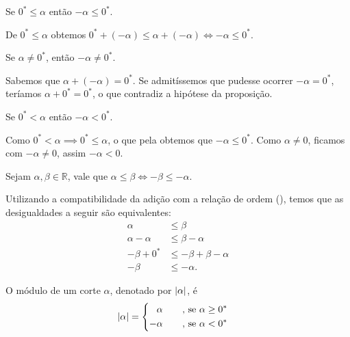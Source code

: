 \documentclass[../main.tex]{subfiles}
\begin{document}
\begin{prop}\label{reais-prop-xPositivoMenosxNegativo1}
    Se $0^* \leq \alpha$ então $-\alpha \leq 0^*$.
\end{prop}
\begin{dem}
    De $0^* \leq \alpha$ obtemos $0^* + (-\alpha) \leq \alpha + (-\alpha) \iff -\alpha \leq 0^*$.
\end{dem}
\begin{prop}
    Se $\alpha \neq 0^*$, então $-\alpha \neq 0^*$.
\end{prop}
\begin{dem}
    Sabemos que $\alpha + (-\alpha) = 0^*$. Se admitíssemos que pudesse ocorrer $-\alpha = 0^*$, teríamos $\alpha + 0^* = 0^*$, o que contradiz a hipótese da proposição. 
\end{dem}
\begin{corol}\label{reais-corol-xPositivoMenosxNegativo1}
    Se $0^* < \alpha$ então $-\alpha < 0^*$.
\end{corol}
\begin{dem}
    Como $0^* < \alpha \implies 0^* \leq \alpha$, o que pela  obtemos que $-\alpha \leq 0^*$. Como $\alpha \neq 0$, ficamos com $-\alpha \neq 0$, assim $-\alpha < 0$.
\end{dem}

\begin{teo}\label{reais-teo-desigualdadeSimetrico}
    Sejam $\alpha, \beta \in \mathbb{R}$, vale que $\alpha \leq \beta \iff -\beta \leq -\alpha$.
\end{teo}
\begin{dem}
    Utilizando a compatibilidade da adição com a relação de ordem (), temos que as desigualdades a seguir são equivalentes:
    \begin{align*}
        \alpha &\leq \beta \\
        \alpha - \alpha &\leq \beta - \alpha \\
        -\beta + 0^* &\leq - \beta + \beta - \alpha \\
        -\beta &\leq -\alpha.
    \end{align*}
\end{dem}

\begin{defi}\label{reais-def-modulo1}
    O módulo de um corte $\alpha$, denotado por $\abs{\alpha}$, é 
    \begin{equation*}
        \abs{\alpha} = 
        \begin{cases}
        \begin{aligned}
             &\alpha \hspace{0.6cm} \text{ , se } \alpha \geq 0^* \\
            -&\alpha \hspace{0.6cm} \text{ , se } \alpha < 0^*
        \end{aligned}
        \end{cases}            
    \end{equation*}
\end{defi}
\end{document}

